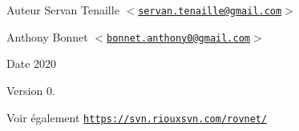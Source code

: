 \begin{DoxyAuthor}{Auteur}
Servan Tenaille $<$\href{mailto:servan.tenaille@gmail.com}{\tt servan.\+tenaille@gmail.\+com}$>$ 

Anthony Bonnet $<$\href{mailto:bonnet.anthony0@gmail.com}{\tt bonnet.\+anthony0@gmail.\+com}$>$ 
\end{DoxyAuthor}
\begin{DoxyDate}{Date}
2020 
\end{DoxyDate}
\begin{DoxyVersion}{Version}
0. 
\end{DoxyVersion}
\begin{DoxySeeAlso}{Voir également}
\href{https://svn.riouxsvn.com/rovnet/}{\tt https\+://svn.\+riouxsvn.\+com/rovnet/} 
\end{DoxySeeAlso}
